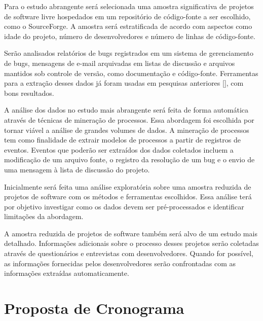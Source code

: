 \documentclass{article}
\begin{document}
Para o estudo abrangente será selecionada uma amostra significativa de projetos
de software livre hospedados em um repositório de código-fonte a ser escolhido,
como o SourceForge. A amostra será estratificada de acordo com aspectos como
idade do projeto, número de desenvolvedores e número de linhas de código-fonte.

Serão analisados relatórios de bugs registrados em um sistema de gerenciamento
de bugs, mensagens de e-mail arquivadas em listas de discussão e arquivos
mantidos sob controle de versão, como documentação e código-fonte. Ferramentas
para a extração desses dados já foram usadas em pesquisas anteriores [], com
bons resultados.

A análise dos dados no estudo mais abrangente será feita de forma automática
através de técnicas de mineração de processos. Essa abordagem foi escolhida por
tornar viável a análise de grandes volumes de dados. A mineração de processos
tem como finalidade de extrair modelos de processos a partir de registros de
eventos. Eventos que poderão ser extraídos dos dados coletados incluem a
modificação de um arquivo fonte, o registro da resolução de um bug e o envio de
uma mensagem à lista de discussão do projeto.


Inicialmente será feita uma análise exploratória sobre uma amostra reduzida de
projetos de software com os métodos e ferramentas escolhidos. Essa análise terá
por objetivo investigar como os dados devem ser pré-processados e identificar
limitações da abordagem.

A amostra reduzida de projetos de software também será alvo de um estudo mais
detalhado. Informações adicionais sobre o processo desses projetos serão
coletadas através de questionários e entrevistas com desenvolvedores. Quando
for possível, as informações fornecidas pelos desenvolvedores serão
confrontadas com as informações extraídas automaticamente. 



\section{Proposta de Cronograma}
\end{document}
